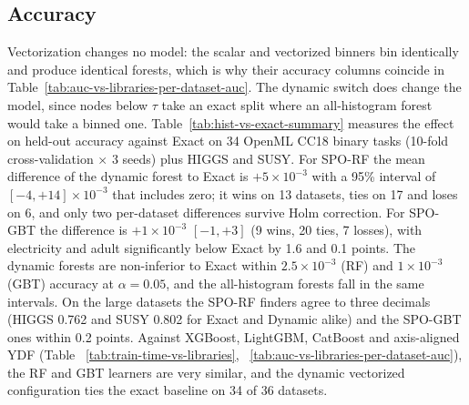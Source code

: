 \documentclass[sigconf]{acmart}%
\newcommand{\TODO}[1]{\textbf{\textcolor{red}{#1}}}
\begin{document}




%
% 

\subsection{Accuracy}
\label{sec:res-accuracy}


Vectorization changes no model: the scalar and vectorized binners bin identically and produce identical forests, which is why their accuracy columns coincide in Table~\ref{tab:auc-vs-libraries-per-dataset-auc}. The dynamic switch does change the model, since nodes below $\tau$ take an exact split where an all-histogram forest would take a binned one. Table~\ref{tab:hist-vs-exact-summary} measures the effect on held-out accuracy against Exact on 34 OpenML CC18 binary tasks (10-fold cross-validation $\times$ 3 seeds) plus HIGGS and SUSY. For SPO-RF the mean difference of the dynamic forest to Exact is $+5\times10^{-3}$ with a 95\% interval of $[-4, +14]\times10^{-3}$ that includes zero; it wins on 13 datasets, ties on 17 and loses on 6, and only two per-dataset differences survive Holm correction. For SPO-GBT the difference is $+1\times10^{-3}$ $[-1, +3]$ (9 wins, 20 ties, 7 losses), with electricity and adult significantly below Exact by 1.6 and 0.1 points. The dynamic forests are non-inferior to Exact within $2.5\times10^{-3}$ (RF) and $1\times10^{-3}$ (GBT) accuracy at $\alpha=0.05$, and the all-histogram forests fall in the same intervals. On the large datasets the SPO-RF finders agree to three decimals (HIGGS 0.762 and SUSY 0.802 for Exact and Dynamic alike) and the SPO-GBT ones within 0.2 points. Against XGBoost, LightGBM, CatBoost and axis-aligned YDF (Table ~\ref{tab:train-time-vs-libraries}, ~\ref{tab:auc-vs-libraries-per-dataset-auc}), the RF and GBT learners are very similar, and the dynamic vectorized configuration ties the exact baseline on 34 of 36 datasets.
\end{document}

